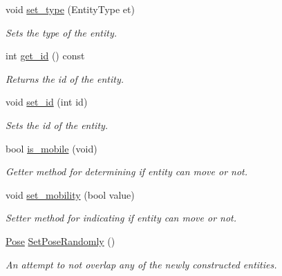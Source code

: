 \begin{DoxyCompactItemize}
void \mbox{\hyperlink{class_arena_entity_aa65c584906d4c22f61488fab98c3392c}{set\+\_\+type}} (Entity\+Type et)
\begin{DoxyCompactList}\small\item\em Sets the type of the entity. \end{DoxyCompactList}\item 
\mbox{\label{class_arena_entity_ae50750dfde8118c27835ea8e9db8b7ef}} 
int \mbox{\hyperlink{class_arena_entity_ae50750dfde8118c27835ea8e9db8b7ef}{get\+\_\+id}} () const
\begin{DoxyCompactList}\small\item\em Returns the id of the entity. \end{DoxyCompactList}\item 
\mbox{\label{class_arena_entity_a67f4c0467d32eec76ee6ed033ff9ed2f}} 
void \mbox{\hyperlink{class_arena_entity_a67f4c0467d32eec76ee6ed033ff9ed2f}{set\+\_\+id}} (int id)
\begin{DoxyCompactList}\small\item\em Sets the id of the entity. \end{DoxyCompactList}\item 
\mbox{\label{class_arena_entity_a9cfea21220c07502abd084afde49ae65}} 
bool \mbox{\hyperlink{class_arena_entity_a9cfea21220c07502abd084afde49ae65}{is\+\_\+mobile}} (void)
\begin{DoxyCompactList}\small\item\em Getter method for determining if entity can move or not. \end{DoxyCompactList}\item 
\mbox{\label{class_arena_entity_adb5d3089fec5c28cc989e5834fcdaf6c}} 
void \mbox{\hyperlink{class_arena_entity_adb5d3089fec5c28cc989e5834fcdaf6c}{set\+\_\+mobility}} (bool value)
\begin{DoxyCompactList}\small\item\em Setter method for indicating if entity can move or not. \end{DoxyCompactList}\item 
\mbox{\label{class_arena_entity_ad9d597b105a901a79c45cbf704c115d0}} 
\mbox{\hyperlink{struct_pose}{Pose}} \mbox{\hyperlink{class_arena_entity_ad9d597b105a901a79c45cbf704c115d0}{Set\+Pose\+Randomly}} ()
\begin{DoxyCompactList}\small\item\em An attempt to not overlap any of the newly constructed entities. \end{DoxyCompactList}\end{DoxyCompactItemize}


